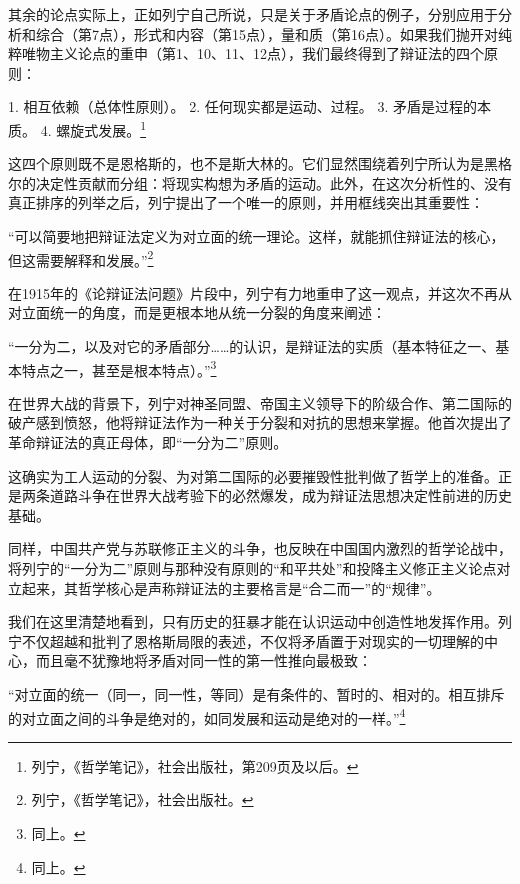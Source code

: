\documentclass[fontset=fandol, a4paper, 12pt, twoside]{ctexart}
\renewenvironment{quote}
  {\list{}{\rightmargin=0cm \leftmargin=2em}%
   \item\relax\small\kaishu\color{black}}
  {\endlist}
\begin{document}
其余的论点实际上，正如列宁自己所说，只是关于矛盾论点的例子，分别应用于分析和综合（第7点），形式和内容（第15点），量和质（第16点）。如果我们抛开对纯粹唯物主义论点的重申（第1、10、11、12点），我们最终得到了辩证法的四个原则：

1. 相互依赖（总体性原则）。
2. 任何现实都是运动、过程。
3. 矛盾是过程的本质。
4. 螺旋式发展。\footnote{列宁，《哲学笔记》，社会出版社，第209页及以后。}

这四个原则既不是恩格斯的，也不是斯大林的。它们显然围绕着列宁所认为是黑格尔的决定性贡献而分组：将现实构想为矛盾的运动。此外，在这次分析性的、没有真正排序的列举之后，列宁提出了一个唯一的原则，并用框线突出其重要性：

\begin{quote}
“可以简要地把辩证法定义为对立面的统一理论。这样，就能抓住辩证法的核心，但这需要解释和发展。”\footnote{列宁，《哲学笔记》，社会出版社。}
\end{quote}

在1915年的《论辩证法问题》片段中，列宁有力地重申了这一观点，并这次不再从对立面统一的角度，而是更根本地从统一分裂的角度来阐述：

\begin{quote}
“一分为二，以及对它的矛盾部分……的认识，是辩证法的实质（基本特征之一、基本特点之一，甚至是根本特点）。”\footnote{同上。}
\end{quote}

在世界大战的背景下，列宁对神圣同盟、帝国主义领导下的阶级合作、第二国际的破产感到愤怒，他将辩证法作为一种关于分裂和对抗的思想来掌握。他首次提出了革命辩证法的真正母体，即“一分为二”原则。

这确实为工人运动的分裂、为对第二国际的必要摧毁性批判做了哲学上的准备。正是两条道路斗争在世界大战考验下的必然爆发，成为辩证法思想决定性前进的历史基础。

同样，中国共产党与苏联修正主义的斗争，也反映在中国国内激烈的哲学论战中，将列宁的“一分为二”原则与那种没有原则的“和平共处”和投降主义修正主义论点对立起来，其哲学核心是声称辩证法的主要格言是“合二而一”的“规律”。

我们在这里清楚地看到，只有历史的狂暴才能在认识运动中创造性地发挥作用。列宁不仅超越和批判了恩格斯局限的表述，不仅将矛盾置于对现实的一切理解的中心，而且毫不犹豫地将矛盾对同一性的第一性推向最极致：

\begin{quote}
“对立面的统一（同一，同一性，等同）是有条件的、暂时的、相对的。相互排斥的对立面之间的斗争是绝对的，如同发展和运动是绝对的一样。”\footnote{同上。}
\end{quote}
\end{document}
